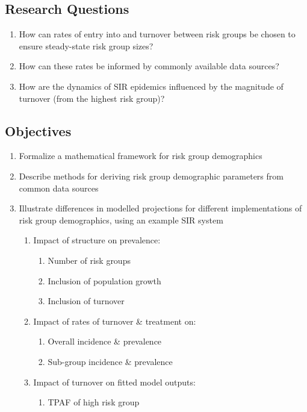 \documentclass{article}
\date{2019 April 05}
\begin{document}
  \maketitle
  \subsection*{Research Questions}
  \begin{enumerate}
    \item How can rates of entry into and turnover between risk groups
    be chosen to ensure steady-state risk group sizes?
    \item How can these rates be informed by commonly available data sources?
    \item How are the dynamics of SIR epidemics influenced by the magnitude of turnover
    (from the highest risk group)?
  \end{enumerate}
  \subsection*{Objectives}
  \begin{enumerate}
    \item Formalize a mathematical framework for risk group demographics
    \item Describe methods for deriving risk group demographic parameters from common data sources
    \item Illustrate differences in modelled projections
    for different implementations of risk group demographics,
    using an example SIR system
    \begin{enumerate}
      \item Impact of structure on prevalence:
      \begin{enumerate}
        \item Number of risk groups
        \item Inclusion of population growth
        \item Inclusion of turnover
      \end{enumerate}
      \item Impact of rates of turnover \& treatment on:
      \begin{enumerate}
        \item Overall incidence \& prevalence
        \item Sub-group incidence \& prevalence
      \end{enumerate}
      \item Impact of turnover on fitted model outputs:
      \begin{enumerate}
        \item TPAF of high risk group
      \end{enumerate}
    \end{enumerate}
  \end{enumerate}
\end{document}
